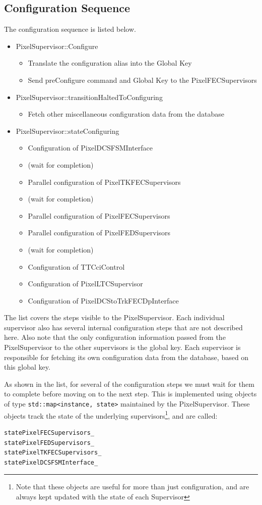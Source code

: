 \subsection{Configuration Sequence}
The configuration sequence is listed below.
\begin{itemize}
\item PixelSupervisor::Configure
\begin{itemize}
\item Translate the configuration alias into the Global Key
\item Send preConfigure command and Global Key to the PixelFECSupervisors
\end{itemize}
\item PixelSupervisor::transitionHaltedToConfiguring
\begin{itemize}
\item Fetch other miscellaneous configuration data from the database
\end{itemize}
\item PixelSupervisor::stateConfiguring
\begin{itemize}
\item Configuration of PixelDCSFSMInterface
\item (wait for completion)
\item Parallel configuration of PixelTKFECSupervisors
\item (wait for completion)
\item Parallel configuration of PixelFECSupervisors
\item Parallel configuration of PixelFEDSupervisors
\item (wait for completion)
\item Configuration of TTCciControl
\item Configuration of PixelLTCSupervisor
\item Configuration of PixelDCStoTrkFECDpInterface
\end{itemize}
\end{itemize}
The list covers the steps visible to the PixelSupervisor. Each
individual supervisor also has several internal configuration steps
that are not described here. Also note that the only configuration
information passed from the PixelSupervisor to the other supervisors
is the global key. Each supervisor is responsible for fetching its own
configuration data from the database, based on this global key.

As shown in the list, for several of the configuration steps we must
wait for them to complete before moving on to the next step. This is
implemented using objects of type {\tt std::map<instance, state>}
maintained by the PixelSupervisor. These objects track the state of
the underlying supervisors\footnote{Note that these objects are useful for more than just configuration, and are always kept updated with the state of each Supervisor}, and are called:
\begin{verbatim}
statePixelFECSupervisors_
statePixelFEDSupervisors_
statePixelTKFECSupervisors_
statePixelDCSFSMInterface_
\end{verbatim}

